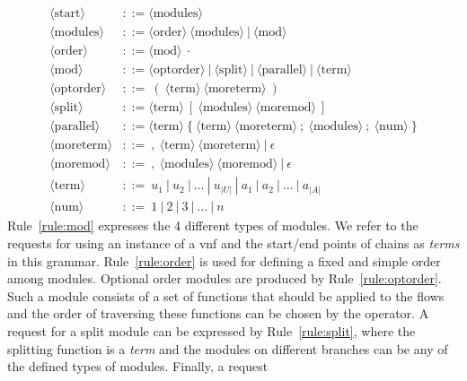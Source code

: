 \documentclass[10pt,a4paper,conference]{IEEEtran}
\begin{document}
{\footnotesize
  \begin{align}
  \label{rule:start} \langle\text{start}\rangle & ::= \langle\text{modules}\rangle \\ 
  \label{rule:modules}\langle\text{modules}\rangle & ::= \langle\text{order}\rangle~\langle\text{modules}\rangle ~|~\langle\text{mod}\rangle \\ 
  \label{rule:order}\langle\text{order}\rangle & ::= \langle\text{mod}\rangle~\cdot \\ 
  \label{rule:mod}\langle\text{mod}\rangle & ::= \langle\text{optorder}\rangle~|~\langle\text{split}\rangle~|~\langle\text{parallel}\rangle~|~\langle\text{term}\rangle \\  
  \label{rule:optorder}\langle\text{optorder}\rangle & ::= ~(~\langle\text{term}\rangle~\langle\text{moreterm}\rangle~) \\ 
  \label{rule:split}\langle\text{split}\rangle & ::= \langle\text{term}\rangle~[~\langle\text{modules}\rangle~\langle\text{moremod}\rangle~] \\ 
  \label{rule:parallel}\langle\text{parallel}\rangle & ::= \langle\text{term}\rangle~\{~\langle\text{term}\rangle~\langle\text{moreterm}\rangle~;~\langle\text{modules}\rangle~;~\langle\text{num}\rangle~\} \\ 
  \label{rule:moreinst}\langle\text{moreterm}\rangle & ::= ~,~\langle\text{term}\rangle~\langle\text{moreterm}\rangle~|~\epsilon \\  
  \label{rule:moremod}\langle\text{moremod}\rangle & ::= ~,~\langle\text{modules}\rangle~\langle\text{moremod}\rangle~|~\epsilon \\ 
  \label{rule:term}\langle\text{term}\rangle & ::= ~u_1~|~u_2~|~\dotsc~|~u_{|U|}~|~a_1~|~a_2~|~\dotsc~|~a_{|A|} \\ 
  \label{rule:num}\langle\text{num}\rangle & ::= ~1~|~2~|~3~|~\dotsc~|~n
  \end{align}
  }
Rule~\ref{rule:mod} expresses the 4 different types of modules. We refer to the 
requests for using an instance of a \ac{vnf} and the start/end points of chains as 
\emph{terms} in this grammar. Rule~\ref{rule:order} is used for defining a fixed 
and simple order among modules. Optional order modules are produced by 
Rule~\ref{rule:optorder}. Such a module consists of a set of functions that
should be applied to the flows and the order of traversing these functions can be
chosen by the operator. A request for a split module can be expressed by 
Rule~\ref{rule:split}, where the splitting function is a \emph{term} and the modules
on different branches can be any of the defined types of modules. Finally, a request 
\end{document}
